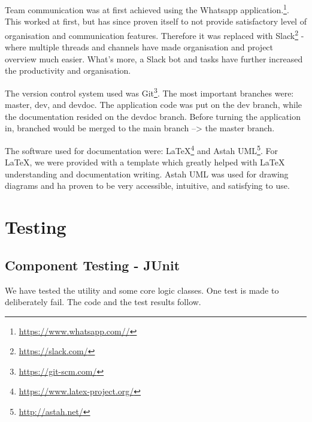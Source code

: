 		Team communication was at first achieved using the Whatsapp application.\footnote{\url{https://www.whatsapp.com//}}. This worked at first, but has since proven itself to not provide satisfactory level of organisation and communication features. Therefore it was replaced with Slack\footnote{\url{https://slack.com/}} - where multiple threads and channels have made organisation and project overview much easier. What's more, a Slack bot and tasks have further increased the productivity and organisation.
		
		The version control system used was Git\footnote{\url{https://git-scm.com/}}. The most important branches were: master, dev, and devdoc. The application code was put on the dev branch, while the documentation resided on the devdoc branch. Before turning the application in, branched would be merged to the main branch --> the master branch. 
		
		The software used for documentation were: LaTeX\footnote{\url{https://www.latex-project.org/}} and Astah UML\footnote{\url{http://astah.net/}}. For LaTeX, we were provided with a template which greatly helped with LaTeX understanding and documentation writing. Astah UML was used for drawing diagrams and ha proven to be very accessible, intuitive, and satisfying to use.
		
		\eject 
	
		\section{Testing}
	
			
			\subsection{Component Testing - JUnit}
			
			We have tested the utility and some core logic classes. One test is made to deliberately fail. The code and the test results follow.
			

